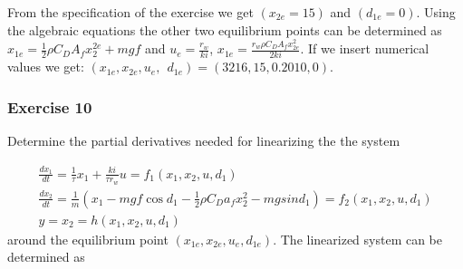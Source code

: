 From the specification of the exercise we get $(x_{2e}=15)$ and $(d_{1e}=0)$. Using the algebraic equations the other two equilibrium points can be determined as $x_{1e}=\frac{1}{2}\rho C_D A_f x^{2e}_2+m g f$ and 
$u_{e}=\frac{r_w}{k i}$, $x_{1e}=\frac{r_w\rho C_D A_f x^2_{2e}}{2k i}$. If we insert numerical values we get: $(x_{1e},x_{2e},u_{e}, ~~d_{1e})=(3216, 15, 0.2010, 0)$.

\subsubsection{Exercise 10}

Determine the partial derivatives needed for linearizing the the system

\begin{eqnarray}
\frac{d x_1}{dt} = \frac{1}{\tau}x_1 + \frac{ki}{\tau r_w}u = f_1(x_1, x_2, u, d_1) \nonumber \\
\frac{d x_2}{dt} = \frac{1}{m} (x_1 - mgf\cos d_1 - \frac{1}{2}\rho C_D a_f x_{2}^2 - mgsin d_1 ) = f_2(x_1, x_2, u, d_1) \nonumber \\
y = x_2 = h(x_1, x_2, u, d_1) \nonumber
\end{eqnarray}
around the equilibrium point $(x_{1e}, x_{2e}, u_e, d_{1e})$. The linearized system can be determined as


